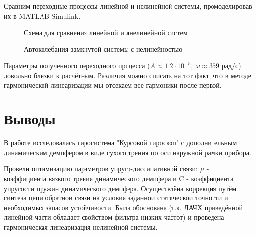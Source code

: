\documentclass[main.tex]{subfiles}
\begin{document}
Сравним переходные процессы линейной и нелинейной системы, промоделировав их в MATLAB Simulink.

\begin{figure}[h]
    \caption{Схема для сравнения линейной и лнелинейной систем}
\end{figure}
\begin{figure}[h]
    \caption{Автоколебания замкнутой системы с нелинейностью}
\end{figure}

Параметры полученного переходного процесса (\( A \approx 1.2\cdot 10^{-5},\ \omega \approx 359 \) рад/с)
довольно близки к расчётным. Различия можно списать на тот факт, что в методе гармонической 
линеаризации мы отсекаем все гармоники после первой.

\newpage
\section*{Выводы}
В работе исследовалась гиросистема "Курсовой гироскоп" с дополнительным динамическим 
демпфером в виде сухого трения по оси наружной рамки прибора. \par 
Провели оптимизацию параметров упруго-диссипативной связи:
 \( \mu \) - коэффициента вязкого трения динамического демпфера и C -
коэффициента упругости пружин динамического демпфера. Осуществлёна коррекция путём синтеза цепи 
обратной связи на условия заданной статической точности и необходимых запасов устойчивости. Была
обоснована (т.к. ЛАЧХ приведённой линейной части обладает свойством фильтра низких
частот) и проведена гармоническая линеаризация нелинейной системы. \par
\end{document}
